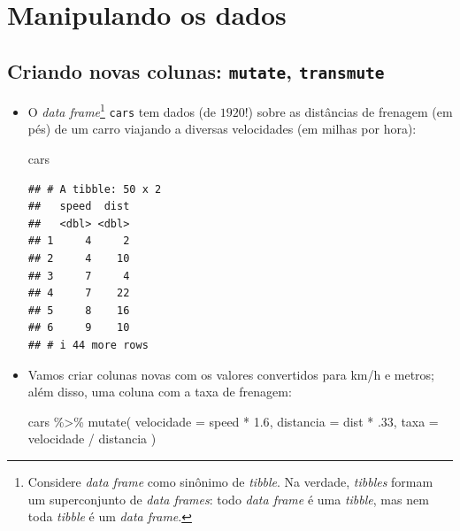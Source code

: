 \documentclass[
  11pt]{report}
\newenvironment{Shaded}{\begin{snugshade}}{\end{snugshade}}
\newcommand{\AttributeTok}[1]{\textcolor[rgb]{0.77,0.63,0.00}{#1}}
\newcommand{\DecValTok}[1]{\textcolor[rgb]{0.00,0.00,0.81}{#1}}
\newcommand{\FloatTok}[1]{\textcolor[rgb]{0.00,0.00,0.81}{#1}}
\newcommand{\FunctionTok}[1]{\textcolor[rgb]{0.00,0.00,0.00}{#1}}
\newcommand{\NormalTok}[1]{#1}
\newcommand{\SpecialCharTok}[1]{\textcolor[rgb]{0.00,0.00,0.00}{#1}}
\renewenvironment{Shaded}{
    \begin{mdframed}[%
      roundcorner=2pt,%
      innerleftmargin=5pt,%
      innerrightmargin=5pt,%
      topline=true,%
      leftline=true,%
      rightline=true,%
      bottomline=true,%
      linewidth=0.5pt,%
      linecolor=black!20,%
      backgroundcolor=black!2,%
      skipabove=2ex,%
      skipbelow=2.5ex%
    ]%
  }
  {
    \end{mdframed}
  }
\begin{document}
\hypertarget{manipulando-os-dados}{%
\section{Manipulando os dados}\label{manipulando-os-dados}}

\hypertarget{criando-novas-colunas-mutate-transmute}{%
\subsection{\texorpdfstring{Criando novas colunas: \texttt{mutate}, \texttt{transmute}}{Criando novas colunas: mutate, transmute}}\label{criando-novas-colunas-mutate-transmute}}

\begin{itemize}
\item
  O \emph{data frame}\footnote{Considere \emph{data frame} como sinônimo de \emph{tibble}. Na verdade, \emph{tibbles} formam um superconjunto de \emph{data frames}: todo \emph{data frame} é uma \emph{tibble}, mas nem toda \emph{tibble} é um \emph{data frame}.} \texttt{cars} tem dados (de $1920$!) sobre as distâncias de frenagem (em pés) de um carro viajando a diversas velocidades (em milhas por hora):

\begin{Shaded}
\begin{Highlighting}[]
\NormalTok{cars}
\end{Highlighting}
\end{Shaded}

\begin{verbatim}
## # A tibble: 50 x 2
##   speed  dist
##   <dbl> <dbl>
## 1     4     2
## 2     4    10
## 3     7     4
## 4     7    22
## 5     8    16
## 6     9    10
## # i 44 more rows
\end{verbatim}
\item
  Vamos criar colunas novas com os valores convertidos para km/h e metros; além disso, uma coluna com a taxa de frenagem:

\begin{Shaded}
\begin{Highlighting}[]
\NormalTok{cars }\SpecialCharTok{\%\textgreater{}\%} 
  \FunctionTok{mutate}\NormalTok{(}
    \AttributeTok{velocidade =}\NormalTok{ speed }\SpecialCharTok{*} \FloatTok{1.6}\NormalTok{,}
    \AttributeTok{distancia =}\NormalTok{ dist }\SpecialCharTok{*}\NormalTok{ .}\DecValTok{33}\NormalTok{,}
    \AttributeTok{taxa =}\NormalTok{ velocidade }\SpecialCharTok{/}\NormalTok{ distancia}
\NormalTok{  )}
\end{Highlighting}
\end{Shaded}


\end{itemize}
\end{document}
